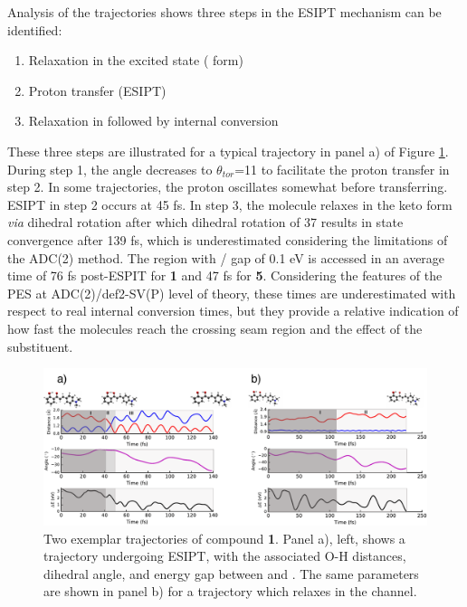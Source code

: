 Analysis of the trajectories shows three steps in the ESIPT mechanism can be identified:
\begin{enumerate}
    \item Relaxation in the excited state (\Estar{} form)
    \item Proton transfer (ESIPT) 
    \item Relaxation in \Kstar{} followed by internal conversion
\end{enumerate}

These three steps are illustrated for a typical trajectory in panel a) of Figure \ref{figure: HC_1_Trajectories}. During step 1, the angle decreases to $\theta_{tor}$=11\textdegree{} to facilitate the proton transfer in step 2. In some trajectories, the proton oscillates somewhat before transferring. ESIPT in step 2 occurs at 45 fs. In step 3, the molecule relaxes in the keto form \textit{via} dihedral rotation after which dihedral rotation of 37\textdegree{} results in state convergence after 139 fs, which is underestimated considering the limitations of the ADC(2) method. The region with \sone/\szero{} gap of 0.1 eV is accessed in an average time of 76 fs post-ESPIT for \textbf{1} and 47 fs for \textbf{5}. Considering the features of the PES at ADC(2)/def2-SV(P) level of theory, these times are underestimated with respect to real internal conversion times, but they provide a relative indication of how fast the molecules reach the crossing seam region and the effect of the substituent.
\begin{figure}[t]
\centering
  \includegraphics[width=0.9\linewidth]{3nonradiativedecay/HC_1_Trajectories.pdf}
  \caption[Typical trajectories for \textbf{HC1}]{Two exemplar trajectories of compound \textbf{1}. Panel a), left, shows a trajectory undergoing ESIPT, with the associated O-H distances, dihedral angle, and energy gap between \sone{} and \szero{}. The same parameters are shown in panel b) for a trajectory which relaxes in the \Estar{} channel.}
  \label{figure: HC_1_Trajectories}
\end{figure}

